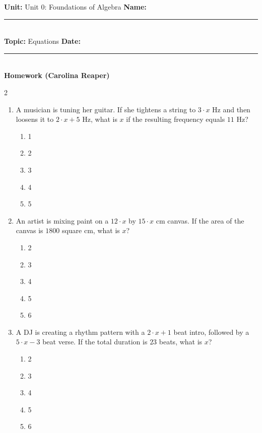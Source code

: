 \documentclass[10pt]{article}
\begin{document}
\enlargethispage{2.5cm}

\begin{tcolorbox}[colback=mainblue!5, colframe=mainblue, sharp corners, boxrule=0.5pt]
    \small \textbf{Unit:} Unit 0: Foundations of Algebra \hfill \textbf{Name:} \rule{3cm}{0.4pt} \\
    \small \textbf{Topic:} Equations \hfill \textbf{Date:} \rule{2cm}{0.4pt} \\
    \centering \textbf{\large Homework (Carolina Reaper)}
\end{tcolorbox}

\vspace{0.2cm}

\begin{multicols}{2}
\begin{enumerate}[label=\textbf{Q\arabic*.}, leftmargin=*, itemsep=6pt, parsep=0pt]

  \item \small A musician is tuning her guitar. If she tightens a string to $3 \cdot x$ Hz and then loosens it to $2 \cdot x + 5$ Hz, what is $x$ if the resulting frequency equals $11$ Hz?
  \begin{enumerate}[label=(\Alph*), leftmargin=0.6cm, nosep, itemsep=2pt]
    \item 1
    \item 2
    \item 3
    \item 4
    \item 5
  \end{enumerate}

  \item \small An artist is mixing paint on a $12 \cdot x$ by $15 \cdot x$ cm canvas. If the area of the canvas is $1800$ square cm, what is $x$?
  \begin{enumerate}[label=(\Alph*), leftmargin=0.6cm, nosep, itemsep=2pt]
    \item 2
    \item 3
    \item 4
    \item 5
    \item 6
  \end{enumerate}

  \item \small A DJ is creating a rhythm pattern with a $2 \cdot x + 1$ beat intro, followed by a $5 \cdot x - 3$ beat verse. If the total duration is $23$ beats, what is $x$?
  \begin{enumerate}[label=(\Alph*), leftmargin=0.6cm, nosep, itemsep=2pt]
    \item 2
    \item 3
    \item 4
    \item 5
    \item 6
  \end{enumerate}


\end{enumerate}
\end{multicols}
\end{document}
